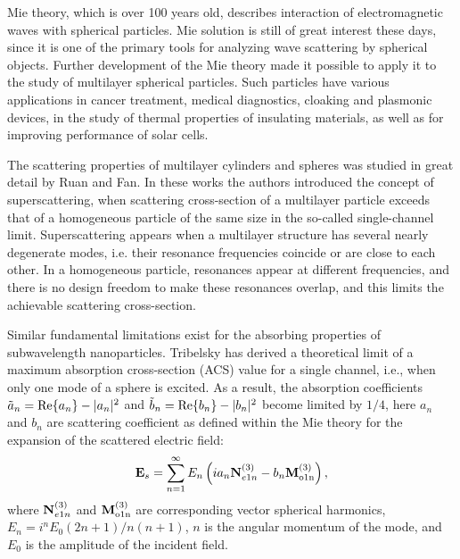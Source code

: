 \documentclass[twoside,twocolumn,9pt]{article}
\begin{document}

\rmfamily %


Mie theory,\cite{Mie-1908} which is over 100 years old, describes
interaction of electromagnetic waves with spherical particles. Mie
solution is still of great interest these
days,\cite{Suzuki-2008,MacKowski-2012,Lerme-2000,Xu-2005,Li-2006,Gogoi-2010,Santiago-2011}
since it is one of the primary tools for analyzing wave scattering by
spherical objects. Further development of the Mie
theory\cite{Yang-2003, Pena-scattnlay-2009} made it possible to apply
it to the study of multilayer spherical
particles.\cite{Sheehan-2013,Selmke-2012} Such particles have various
applications in cancer treatment,\cite{Zhang-2010, Hirsch-2003}
medical diagnostics,\cite{Allain-2002} cloaking\cite{Qui-2009,
  Semouchkina-2013, Ladutenko-2014} and plasmonic
devices,\cite{Liu-MatLett-2015, Martin-2013, Alu-2005,
  Liu-Nanotech-2013} in the study of thermal properties of insulating
materials,\cite{Xie-2013} as well as for improving performance of
solar cells.\cite{Kameya-2011,Mann-2011}

The scattering properties of multilayer cylinders and spheres was
studied in great detail by Ruan and Fan.\cite{Fan-2010,Fan-2011}  In
these works the authors introduced the concept of superscattering,
when scattering cross-section of a multilayer particle exceeds that of
a homogeneous particle of the same size in the so-called
single-channel limit. Superscattering appears when a multilayer
structure has several nearly degenerate modes, i.e. their resonance
frequencies coincide or are close to each other. In a homogeneous
particle, resonances appear at different frequencies, and there is no
design freedom to make these resonances overlap, and this limits the
achievable scattering cross-section.

Similar fundamental limitations exist for the absorbing properties of
subwavelength nanoparticles.  Tribelsky\cite{Tribelsky-2011} has
derived a theoretical limit of a maximum absorption cross-section
(ACS) value for a single channel, i.e., when only one mode of a sphere
is excited.  As a result, the absorption coefficients $\tilde{a}_n=
{\rm Re}\{a_n\} - |a_n|^2 $ and $\tilde{b}_n= {\rm Re}\{b_n\} -
|b_n|^2 $ become limited by $1/4$, here $a_n$ and $b_n$ are scattering
coefficient as defined within the Mie theory\cite{Bohren-1983} for the
expansion of the scattered electric field:
\[
{\rm \mathbf{E}}_s = \sum_{n=1}^{\infty} E_n \left( i a_n {\rm
    \mathbf{N}}_{e1n}^{(3)} - b_n{\rm\mathbf{M}_{o1n}^{(3)}} \right),
\]
where ${\rm \mathbf{N}}_{e1n}^{(3)}$ and ${\rm\mathbf{M}_{o1n}^{(3)}}$
are corresponding vector spherical harmonics,
$E_n=i^nE_0(2n+1)/n(n+1)$, $n$ is the angular momentum of the mode,
and $E_0$ is the amplitude of the incident field.
\end{document}
